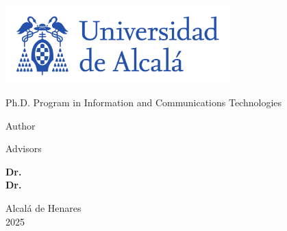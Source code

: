 \thispagestyle{empty}
\large
\begin{center}

  \color{pantone293}

  \centerline{\includegraphics[height=3cm]{include/img/logo_uah_nombre.pdf}}

  \vspace{2cm}

  \huge{Ph.D. Program in Information and Communications Technologies}

  \vspace{2cm}   
  
  \Huge\textbf{\titulotesis}

  \vspace{10mm}
  
  \huge{{Author}}\\
  \huge{\textbf{\autortesis}}


  \vspace{10mm}
  
  \huge {Advisors}

  \textbf{Dr. \directoruno\\
          Dr. \directordos}


  \color{black}
  

\end{center}

\begin{bottomparagraph}
  \begin{center}

    \color{pantone293}
    \huge {Alcalá de Henares\\2025}
    \color{black}

  \end{center}
\end{bottomparagraph}